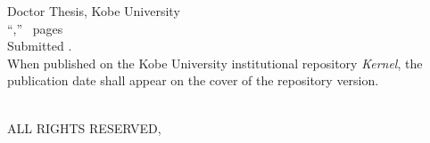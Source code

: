 \documentclass[11pt,twoside,a4paper]{book}
\makeatletter
\def\cleardoublepage{\clearpage\if@twoside \ifodd\c@page\else
	\hbox{}\thispagestyle{empty}\newpage\if@twocolumn\hbox{}\newpage\fi\fi\fi}
\newcommand*\cleartoleftpage{%
	\clearpage
	\ifodd\value{page}\hbox{}\newpage\fi
}
\newcommand{\university}{Kobe University} %
\makeatother
\begin{document}
\cleardoublepage
{}
{}


\cleartoleftpage %
\thispagestyle{empty} %
\vspace*{\fill}
\setcounter{pagesnocover}{\value{page}}
\addtocounter{pagesnocover}{\value{frontpages}} %

\makeatletter
\noindent
Doctor Thesis, \university\\
``\emph{\@title},'' \the\value{pagesnocover}~pages\\
Submitted .\\
When published on the Kobe University institutional repository \textit{Kernel}, the publication date shall appear on the cover of the repository version.

\begin{flushright}
\MakeUppercase{
\textcopyright \@author\\
All Rights Reserved, }
\end{flushright}
\makeatother
\end{document}
